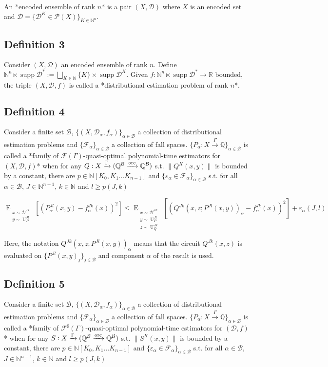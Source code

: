 \documentclass[a4paper]{article}
\DeclareMathOperator{\Supp}{supp}
\newcommand{\EE}[2]{\operatorname{E}_{\substack{#1 \\ #2}}}
\newcommand{\EEE}[3]{\operatorname{E}_{\substack{#1 \\ #2 \\ #3}}}
\DeclareMathOperator{\Un}{U}
\newcommand{\Nats}{\mathbb{N}}
\newcommand{\Rats}{\mathbb{Q}}
\newcommand{\Reals}{\mathbb{R}}
\newcommand{\NatPoly}{\Nats[K_0, K_1 \ldots K_{n-1}]}
\newcommand{\Norm}[1]{\lVert #1 \rVert}
\newcommand{\Dist}{\mathcal{D}}
\newcommand{\Fall}{\mathcal{F}}
\newcommand{\EG}{\Fall(\Gamma)}
\newcommand{\ESG}{\Fall^\sharp(\Gamma)}
\newcommand{\Scheme}{\xrightarrow{\Gamma}}
\newcommand{\ORC}{\xrightarrow{\textnormal{orc}}}
\newcommand{\Base}{\mathcal{B}}
\newcommand{\Prob}{\mathcal{P}}
\begin{document}
An *encoded ensemble of rank ${n}$* is a pair ${(X,\Dist)}$ where ${X}$ is an encoded set and ${\Dist=\{\Dist^K \in \Prob(X)\}_{K \in \Nats^n}}$.

\subsection{Definition 3}

Consider ${(X,\Dist)}$ an encoded ensemble of rank ${n}$. Define ${\Nats^n \ltimes \Supp \Dist^* := \bigsqcup_{K \in \Nats} \{K\} \times \Supp \Dist^K}$. Given ${f: \Nats^n \ltimes \Supp \Dist^* \rightarrow \Reals}$ bounded, the triple ${(X,\Dist,f)}$ is called a *distributional estimation problem of rank ${n}$*.
\subsection{Definition 4}

Consider a finite set ${\Base}$, ${\{(X,\Dist_\alpha,f_\alpha)\}_{\alpha \in \Base}}$ a collection of distributional estimation problems and ${\{\Fall_\alpha\}_{\alpha \in \Base}}$ a collection of fall spaces. ${\{P_\alpha: X \Scheme \Rats\}_{\alpha \in \Base}}$ is called a *family of ${\EG}$-quasi-optimal polynomial-time estimators for ${(X,\Dist,f)}$* when for any ${Q: X \Scheme (\Rats^{\Base} \ORC \Rats^{\Base})}$ s.t. ${\Norm{Q^K(x,y)}}$ is bounded by a constant, there are ${p \in \NatPoly}$ and ${\{\varepsilon_\alpha \in \Fall_\alpha\}_{\alpha \in \Base}}$ s.t. for all ${\alpha \in \Base}$, ${J \in \Nats^{n-1}}$, ${k \in \Nats}$ and ${l \geq p(J,k)}$

$$\EE{x \sim \Dist^{Jk}}{y \sim \Un_P^{Jl}}[(P_\alpha^{Jl}(x,y)-f_\alpha^{Jk}(x))^2] \leq \EEE{x \sim \Dist^{Jk}}{y \sim \Un_P^{Jl}}{z \sim \Un_Q^{Jk}}[(Q^{Jk}(x,z;P^{Jl}(x,y))_\alpha-f_\alpha^{Jk}(x))^2]+\varepsilon_\alpha(J,l)$$

Here, the notation ${Q^{Jk}(x,z;P^{Jl}(x,y))_\alpha}$ means that the circuit ${Q^{Jk}(x,z)}$ is evaluated on ${\{P^{Jl}(x,y)_j\}_{j \in \Base}}$ and component ${\alpha}$ of the result is used.

\subsection{Definition 5}

Consider a finite set ${\Base}$, ${\{(X,\Dist_\alpha,f_\alpha)\}_{\alpha \in \Base}}$ a collection of distributional estimation problems and ${\{\Fall_\alpha\}_{\alpha \in \Base}}$ a collection of fall spaces. ${\{P_\alpha: X \Scheme \Rats\}_{\alpha \in \Base}}$ is called a *family of ${\ESG}$-quasi-optimal polynomial-time estimators for ${(\Dist,f)}$* when for any ${S: X \Scheme (\Rats^{\Base} \ORC \Rats^{\Base})}$ s.t. ${\Norm{S^K(x,y)}}$ is bounded by a constant, there are ${p \in \NatPoly}$ and ${\{\varepsilon_\alpha \in \Fall_\alpha\}_{\alpha \in \Base}}$ s.t. for all ${\alpha \in \Base}$, ${J \in \Nats^{n-1}}$, ${k \in \Nats}$ and ${l \geq p(J,k)}$
\end{document}
